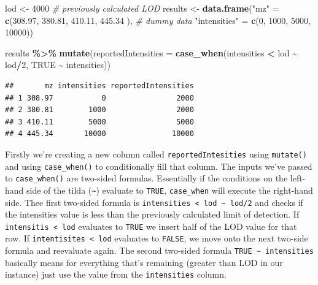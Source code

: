\documentclass[
]{book}
\newenvironment{Shaded}{\begin{snugshade}}{\end{snugshade}}
\newcommand{\AttributeTok}[1]{\textcolor[rgb]{0.13,0.29,0.53}{#1}}
\newcommand{\CommentTok}[1]{\textcolor[rgb]{0.56,0.35,0.01}{\textit{#1}}}
\newcommand{\ConstantTok}[1]{\textcolor[rgb]{0.56,0.35,0.01}{#1}}
\newcommand{\DecValTok}[1]{\textcolor[rgb]{0.00,0.00,0.81}{#1}}
\newcommand{\FloatTok}[1]{\textcolor[rgb]{0.00,0.00,0.81}{#1}}
\newcommand{\FunctionTok}[1]{\textcolor[rgb]{0.13,0.29,0.53}{\textbf{#1}}}
\newcommand{\NormalTok}[1]{#1}
\newcommand{\OtherTok}[1]{\textcolor[rgb]{0.56,0.35,0.01}{#1}}
\newcommand{\SpecialCharTok}[1]{\textcolor[rgb]{0.81,0.36,0.00}{\textbf{#1}}}
\newcommand{\StringTok}[1]{\textcolor[rgb]{0.31,0.60,0.02}{#1}}
\begin{document}
\begin{Shaded}
\begin{Highlighting}[]
\NormalTok{lod }\OtherTok{\textless{}{-}} \DecValTok{4000} \CommentTok{\# previously calculated LOD }
\NormalTok{results }\OtherTok{\textless{}{-}} \FunctionTok{data.frame}\NormalTok{(}\StringTok{"mz"} \OtherTok{=} \FunctionTok{c}\NormalTok{(}\FloatTok{308.97}\NormalTok{, }\FloatTok{380.81}\NormalTok{, }\FloatTok{410.11}\NormalTok{, }\FloatTok{445.34}\NormalTok{ ), }\CommentTok{\# dummy data}
                      \StringTok{"intensities"} \OtherTok{=} \FunctionTok{c}\NormalTok{(}\DecValTok{0}\NormalTok{, }\DecValTok{1000}\NormalTok{, }\DecValTok{5000}\NormalTok{, }\DecValTok{10000}\NormalTok{)) }

\NormalTok{results }\SpecialCharTok{\%\textgreater{}\%}
  \FunctionTok{mutate}\NormalTok{(}\AttributeTok{reportedIntensities =} \FunctionTok{case\_when}\NormalTok{(intensities }\SpecialCharTok{\textless{}}\NormalTok{ lod }\SpecialCharTok{\textasciitilde{}}\NormalTok{ lod}\SpecialCharTok{/}\DecValTok{2}\NormalTok{,}
                                 \ConstantTok{TRUE} \SpecialCharTok{\textasciitilde{}}\NormalTok{ intensities))}
\end{Highlighting}
\end{Shaded}

\begin{verbatim}
##       mz intensities reportedIntensities
## 1 308.97           0                2000
## 2 380.81        1000                2000
## 3 410.11        5000                5000
## 4 445.34       10000               10000
\end{verbatim}

Firstly we're creating a new column called \texttt{reportedIntesities} using \texttt{mutate()} and using \texttt{case\_when()} to conditionally fill that column. The inputs we've passed to \texttt{case\_when()} are two-sided formulas. Essentially if the conditions on the left-hand side of the tilda (\texttt{\textasciitilde{}}) evaluate to \texttt{TRUE}, \texttt{case\_when} will execute the right-hand side. Thee first two-sided formula is \texttt{intensities\ \textless{}\ lod\ \textasciitilde{}\ lod/2} and checks if the intensities value is less than the previously calculated limit of detection. If \texttt{intensitis\ \textless{}\ lod} evaluates to \texttt{TRUE} we insert half of the LOD value for that row. If \texttt{intentisites\ \textless{}\ lod} evaluates to \texttt{FALSE}, we move onto the next two-side formula and reevaluate again. The second two-sided formula \texttt{TRUE\ \textasciitilde{}\ intensities} basically means for everything that's remaining (greater than LOD in our instance) just use the value from the \texttt{intensities} column.
\end{document}
